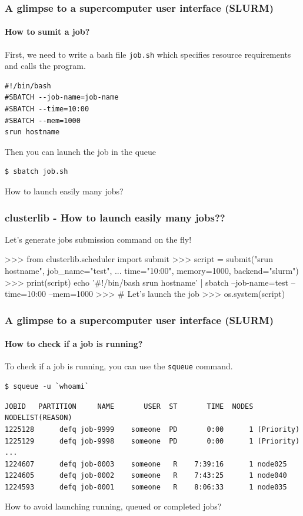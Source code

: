 \documentclass[11pt,compress,serif]{beamer}
\begin{document}
\begin{frame}[fragile=singleslide]
\frametitle{A glimpse to a supercomputer user interface (SLURM)}
\framesubtitle{How to sumit a job?}

First, we need to write a bash file \texttt{job.sh} which specifies 
resource requirements and calls the program.
\begin{verbatim}
#!/bin/bash
#SBATCH --job-name=job-name
#SBATCH --time=10:00
#SBATCH --mem=1000
srun hostname
\end{verbatim}

\vfill

Then you can launch the job in the queue
\begin{verbatim}
$ sbatch job.sh
\end{verbatim}

\vfill

\alert{How to launch easily many jobs?}

\end{frame}

\begin{frame}[fragile=singleslide]
    \frametitle{clusterlib - How to launch easily many jobs??}
    
    Let's generate jobs submission command on the fly!
    
    \begin{pythoncode}
        >>> from clusterlib.scheduler import submit
        >>> script = submit("srun hostname", job_name="test",
        ...                 time="10:00", memory=1000, backend="slurm")
        >>> print(script)
        echo '#!/bin/bash
        srun hostname' | sbatch --job-name=test --time=10:00 --mem=1000 
        >>> # Let's launch the job
        >>> os.system(script)
    \end{pythoncode}
    
\end{frame}


\begin{frame}[fragile=singleslide]
\frametitle{A glimpse to a supercomputer user interface (SLURM)}
\framesubtitle{How to check if a job is running?}

To check if a job is running, you can use the \texttt{squeue} command.

\begin{verbatim}
$ squeue -u `whoami`
\end{verbatim}

\begin{verbatim}
JOBID   PARTITION     NAME       USER  ST       TIME  NODES NODELIST(REASON)
1225128      defq job-9999    someone  PD       0:00      1 (Priority)
1225129      defq job-9998    someone  PD       0:00      1 (Priority)
...
1224607      defq job-0003    someone   R    7:39:16      1 node025
1224605      defq job-0002    someone   R    7:43:25      1 node040
1224593      defq job-0001    someone   R    8:06:33      1 node035
\end{verbatim}

\vfill

\alert{How to avoid launching running, queued or completed jobs?}

\end{frame}
\end{document}
